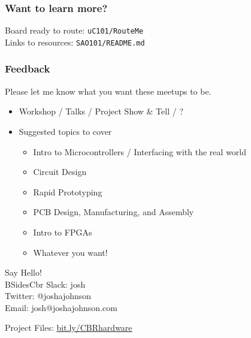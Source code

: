 \documentclass[t]{beamer}
\begin{document}
\begin{frame}
\frametitle{Want to learn more?}
Board ready to route: \texttt{uC101/RouteMe}\\
Links to resources: \texttt{SAO101/README.md}

\end{frame}


\begin{frame}
\frametitle{Feedback}
Please let me know what you want these meetups to be. \\
\begin{itemize}
\item Workshop / Talks / Project Show \& Tell / ?
\item Suggested topics to cover
\begin{itemize}
	\item Intro to Microcontrollers / Interfacing with the real world
	\item Circuit Design
	\item Rapid Prototyping
	\item PCB Design, Manufacturing, and Assembly
	\item Intro to FPGAs
	\item Whatever you want!
\end{itemize}
\end{itemize}
\vspace{5mm}
Say Hello! \\
BSidesCbr Slack: josh\\
Twitter: @\textunderscore joshajohnson\\
Email: josh@joshajohnson.com\\
\vspace{5mm}

Project Files: \url{bit.ly/CBRhardware}\\
\end{frame}
\end{document}
